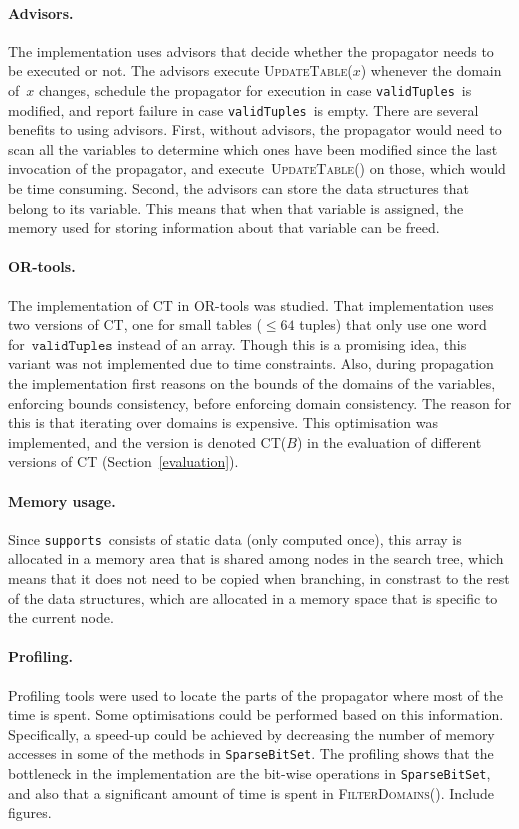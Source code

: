 \documentclass[a4paper,11pt]{article}
\newcommand{\Todo}[1]{{\color{blue}#1}}
\newcommand{\Secref}[1]{Section~\ref{#1}}
\newcommand{\SparseBitSet}{\texttt{SparseBitSet}}
\newcommand{\CurrTable}{\texttt{validTuples}}
\newcommand{\Supports}{\texttt{supports}}
\def\UpdateTable{\textsc{UpdateTable}}
\def\FilterDomains{\textsc{FilterDomains}}
\numberwithin{equation}{section}
\begin{document}
\paragraph{Advisors.} The implementation uses advisors that decide whether
the propagator needs to be executed or not. The advisors execute \UpdateTable($x$)
whenever the domain of~$x$ changes, schedule the propagator for execution
in case \CurrTable~is modified, and report failure in case \CurrTable~is empty.
There are several benefits to using advisors. First, without advisors,
the propagator would need
to scan all the variables to determine which ones have been modified since the last
invocation of the propagator, and execute~\UpdateTable() on those,
which would be time consuming.
Second, the advisors can store the data structures that belong to its variable.
This means that when that variable is assigned, the memory used for storing
information about that variable can be freed.

\paragraph{OR-tools.} The implementation of CT in OR-tools was studied.
That implementation uses two versions of CT, one for small tables 
($\leq 64$ tuples) that only use one word for~$\CurrTable$ instead of an array.
Though this is a
promising idea, this variant was not implemented due to time constraints.
Also, during propagation the implementation
first reasons on the bounds of the domains of the variables, enforcing bounds
consistency,
before enforcing domain consistency. The reason for this is that
iterating over domains is
expensive. This optimisation was implemented, and the version is denoted CT($B$) in the
evaluation of different versions of CT (\Secref{evaluation}).

\paragraph{Memory usage.} Since \Supports~consists of static data (only
computed once), this array is allocated in a memory area that is shared
among nodes in the search tree, which means that it does not need to be
copied when branching, in constrast to the rest of the data structures,
which are allocated
in a memory space that is specific to the current node.

\paragraph{Profiling.} Profiling tools were used to locate the parts of
the propagator where most of the time is spent. Some optimisations could
be performed based on this information. Specifically, a speed-up could be
achieved by decreasing the number of memory accesses in some of the
methods in \SparseBitSet. The profiling shows that the bottleneck 
in the implementation are the bit-wise operations in \SparseBitSet,
and also that a significant amount of time is spent in \FilterDomains().
\Todo{Include figures}.
\end{document}
